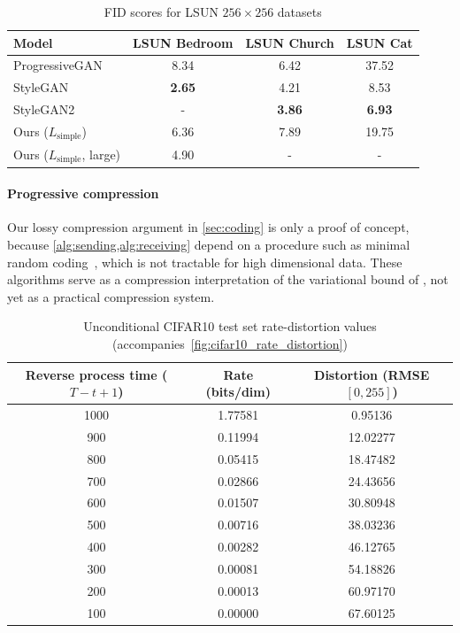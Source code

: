 \documentclass{article}
\begin{document}
\begin{table}[h]
\centering
\caption{FID scores for LSUN $256\times 256$ datasets}
\label{table:lsun_fid}
\begin{tabular}{@{}lccc@{}}
\toprule
Model                        & LSUN Bedroom &  LSUN Church & LSUN Cat \\ \midrule
ProgressiveGAN \cite{karras2018progressive} & 8.34 & 6.42 & 37.52 \\
StyleGAN \cite{karras2019style} & \textbf{2.65} & 4.21\rlap{$^*$}  & 8.53\rlap{$^*$}\\
StyleGAN2 \cite{karras2019analyzing} & - & \textbf{3.86} & \textbf{6.93} \\ \midrule 
Ours ($L_\mathrm{simple}$) & 6.36 & 7.89 & 19.75 \\
Ours ($L_\mathrm{simple}$, large) & 4.90 & - & - \\ \bottomrule
\end{tabular}
\end{table}

\paragraph{Progressive compression}
Our lossy compression argument in \cref{sec:coding} is only a proof of concept, because \cref{alg:sending,alg:receiving} depend on a procedure such as minimal random coding~\citep{havasi2018minimal}, which is not tractable for high dimensional data. These algorithms serve as a compression interpretation of the variational bound  of \citet{sohl2015deep}, not yet as a practical compression system.

\begin{table}[h]
\centering
\caption{Unconditional CIFAR10 test set rate-distortion values  (accompanies~\cref{fig:cifar10_rate_distortion})}
\label{table:cifar10_rate_distortion_table}
\begin{tabular}{ccc}
\toprule
Reverse process time ($T-t+1$) & Rate (bits/dim) & Distortion (RMSE $[0, 255]$) \\
\midrule
1000 & 1.77581 & 0.95136 \\
900 & 0.11994 & 12.02277 \\
800 & 0.05415 & 18.47482 \\
700 & 0.02866 & 24.43656 \\
600 & 0.01507 & 30.80948 \\
500 & 0.00716 & 38.03236 \\
400 & 0.00282 & 46.12765 \\
300 & 0.00081 & 54.18826 \\
200 & 0.00013 & 60.97170 \\
100 & 0.00000 & 67.60125 \\
\bottomrule
\end{tabular}
\end{table}
\end{document}
